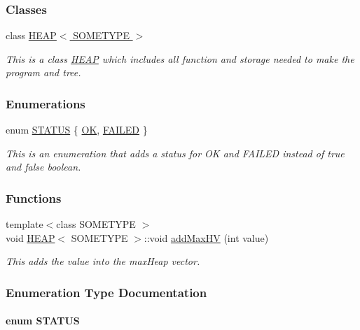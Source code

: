 \subsubsection*{Classes}
\begin{DoxyCompactItemize}
\item 
class \hyperlink{classHEAP}{H\+E\+A\+P$<$ S\+O\+M\+E\+T\+Y\+P\+E $>$}
\begin{DoxyCompactList}\small\item\em This is a class \hyperlink{classHEAP}{H\+E\+A\+P} which includes all function and storage needed to make the program and tree. \end{DoxyCompactList}\end{DoxyCompactItemize}
\subsubsection*{Enumerations}
\begin{DoxyCompactItemize}
\item 
enum \hyperlink{HEAP_8H_a32c27cc471df37f4fc818d65de0a56c4}{S\+T\+A\+T\+U\+S} \{ \hyperlink{HEAP_8H_a32c27cc471df37f4fc818d65de0a56c4a2bc49ec37d6a5715dd23e85f1ff5bb59}{O\+K}, 
\hyperlink{HEAP_8H_a32c27cc471df37f4fc818d65de0a56c4aecedb56d1405a60c6069f4a0139bdec5}{F\+A\+I\+L\+E\+D}
 \}
\begin{DoxyCompactList}\small\item\em This is an enumeration that adds a status for O\+K and F\+A\+I\+L\+E\+D instead of true and false boolean. \end{DoxyCompactList}\end{DoxyCompactItemize}
\subsubsection*{Functions}
\begin{DoxyCompactItemize}
\item 
{\footnotesize template$<$class S\+O\+M\+E\+T\+Y\+P\+E $>$ }\\void \hyperlink{classHEAP}{H\+E\+A\+P}$<$ S\+O\+M\+E\+T\+Y\+P\+E $>$\+::void \hyperlink{HEAP_8H_ac4a84c5d4f565cec7c43b7a43d4aec9d}{add\+Max\+H\+V} (int value)
\begin{DoxyCompactList}\small\item\em This adds the value into the max\+Heap vector. \end{DoxyCompactList}\end{DoxyCompactItemize}


\subsubsection{Enumeration Type Documentation}
\hypertarget{HEAP_8H_a32c27cc471df37f4fc818d65de0a56c4}{
\paragraph[{S\+T\+A\+T\+U\+S}]{\setlength{\rightskip}{0pt plus 5cm}enum {\bf S\+T\+A\+T\+U\+S}}}\label{HEAP_8H_a32c27cc471df37f4fc818d65de0a56c4}


